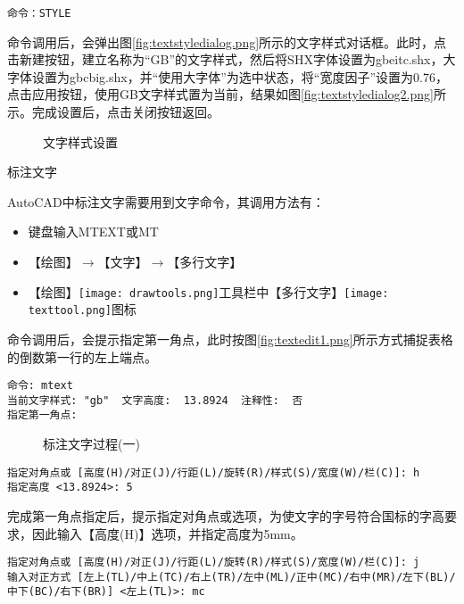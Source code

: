 \begin{procedure}
\begin{lstlisting}
命令：STYLE
\end{lstlisting}

命令调用后，会弹出图\ref{fig:textstyledialog.png}所示的文字样式对话框。此时，点击新建按钮，建立名称为“GB”的文字样式，然后将SHX字体设置为gbeitc.shx，大字体设置为gbcbig.shx，并“使用大字体”为选中状态，将“宽度因子”设置为0.76，点击应用按钮，使用GB文字样式置为当前，结果如图\ref{fig:textstyledialog2.png}所示。完成设置后，点击关闭按钮返回。
\begin{figure}[htbp]
\centering
{}\hspace{20pt}
\caption{文字样式设置}
\end{figure}
\item 标注文字

AutoCAD中标注文字需要用到文字命令，其调用方法有：
\begin{itemize}
\item 键盘输入MTEXT或MT
\item 【绘图】$\rightarrow$【文字】$\rightarrow$【多行文字】
\item 【绘图】\texttt{[image: drawtools.png]}工具栏中【多行文字】\texttt{[image: texttool.png]}图标
\end{itemize}

命令调用后，会提示指定第一角点，此时按图\ref{fig:textedit1.png}所示方式捕捉表格的倒数第一行的左上端点。
\begin{lstlisting}
命令: mtext
当前文字样式: "gb"  文字高度:  13.8924  注释性:  否
指定第一角点:
\end{lstlisting}
\begin{figure}[htbp]
\centering
{}\hspace{20pt}
\caption{标注文字过程(一)}
\end{figure}
\begin{lstlisting}
指定对角点或 [高度(H)/对正(J)/行距(L)/旋转(R)/样式(S)/宽度(W)/栏(C)]: h
指定高度 <13.8924>: 5
\end{lstlisting}

完成第一角点指定后，提示指定对角点或选项，为使文字的字号符合国标的字高要求，因此输入【高度(H)】选项，并指定高度为5mm。
\begin{lstlisting}
指定对角点或 [高度(H)/对正(J)/行距(L)/旋转(R)/样式(S)/宽度(W)/栏(C)]: j
输入对正方式 [左上(TL)/中上(TC)/右上(TR)/左中(ML)/正中(MC)/右中(MR)/左下(BL)/中下(BC)/右下(BR)] <左上(TL)>: mc
\end{lstlisting}


\end{procedure}
